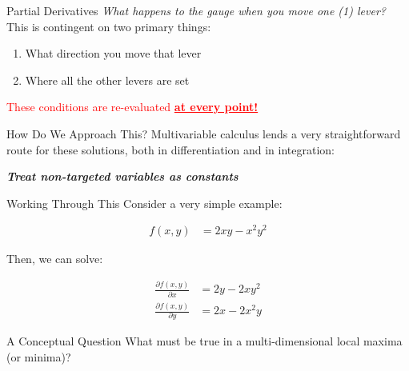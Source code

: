 \documentclass[10pt]{beamer}
\begin{document}
\begin{frame}{Partial Derivatives}
    \textit{What happens to the gauge when you move one (1) lever?} \\

    \vspace{.5cm}
    This is contingent on two primary things:
    \begin{enumerate}
        \item What direction you move that lever
        \item Where all the other levers are set
    \end{enumerate}
\vspace{1cm}
    \textcolor{red}{These conditions are re-evaluated \textbf{\underline{at every point!}}}
\end{frame}

\begin{frame}{How Do We Approach This?}
    Multivariable calculus lends a very straightforward route for these solutions, both in differentiation and in integration:

    \emph{\textbf{Treat non-targeted variables as constants}}
\end{frame}

\begin{frame}{Working Through This}
    Consider a very simple example:

    \begin{align*}
        f(x,y) &= 2xy - x^2y^2
    \end{align*}

    Then, we can solve: \pause

    \begin{align*}
        \frac{\partial f(x,y)}{\partial x} &= 2y - 2xy^2 \\
        \frac{\partial f(x,y)}{\partial y} &= 2x - 2x^2y
    \end{align*}
\end{frame}

\begin{frame}{A Conceptual Question}
What must be true in a multi-dimensional local maxima (or minima)?
\end{frame}
\end{document}
